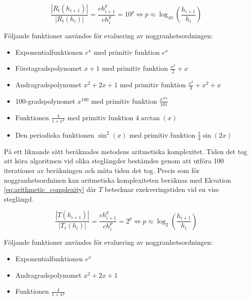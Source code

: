\documentclass[a4paper,titlepage]{article}
\begin{document}
\begin{equation}
    \label{eq:orderofaccuracy}
    \frac{| R_t(h_{i+1})|}{| R_t(h_{i})|}  = \frac{ch_{i+1}^p}{ch_{i}^p} = 10^p
    \Leftrightarrow p \approx \log_{10}\left( \frac{h_{i+1}}{h_i} \right)
\end{equation}

Följande funktioner användes för evaluering av noggranhetsordningen:

\begin{itemize}
    \item Exponentialfunktionen $e^x$ med primitiv funktion $e^x$
    \item Förstagradspolynomet $x + 1$ med primitiv funktion $\frac{x^2}{2} + x$
    \item Andragradspolynomet $x^2 + 2x + 1$ med primitiv funktion
        $\frac{x^3}{3} + x^2 + x$
    \item 100-gradspolynomet $x^{100}$ med primitiv funktion
        $\frac{x^{101}}{101}$
    \item Funktionen $\frac{4}{1 + x^2}$ med primitiv funktion $4\arctan(x)$
    \item Den periodiska funktionen $\sin^2(x)$ med primitiv funktion
        $\frac{1}{4}\sin(2x)$
\end{itemize}


På ett liknande sätt beräknades metodens aritmetiska komplexitet. Tiden det tog att köra
algoritmen vid olika steglängder bestämdes genom att utföra 100 iterationer av beräkningen
och mäta tiden det tog. Precis som för noggranhetsordninen kan aritmetiska komplexiteten
beräknas med Ekvation \ref{eq:arithmetic_complexity} där $T$ betecknar exekveringstiden
vid en viss steglängd.

\begin{equation}
    \label{eq:arithmetic_complexity}
    \frac{| T(h_{i+1})|}{| T_t(h_{i})|}  = \frac{ch_{i+1}^p}{ch_{i}^p} = 2^p
    \Leftrightarrow p \approx \log_{2}\left( \frac{h_{i+1}}{h_i} \right)
\end{equation}

Följande funktioner användes för evaluering av noggranhetsordningen:

\begin{itemize}
    \item Exponentialfunktionen $e^x$
    \item Andragradspolynomet $x^2 + 2x + 1$
    \item Funktionen $\frac{4}{1 + x^2}$
\end{itemize}
\end{document}
